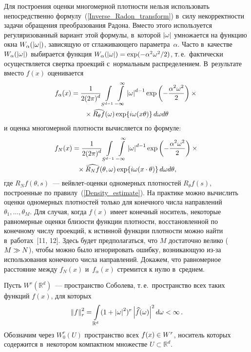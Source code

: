 \begin{multicols}{2}
Для построения оценки многомерной плот\-ности нельзя использовать непосредственно
формулу~(\ref{Inverse_Radon_transform}) в~силу некорректности задачи обращения
преобразования Радона. Вместо этого используется регуляризованный вариант
этой формулы, в~которой $\left\vert\omega\right\vert$ умножается на функцию окна
$W_\alpha(\left\vert\omega\right\vert)$, зависящую от сглаживающего параметра~$\alpha$.
Часто в~качестве $W_\alpha(\left\vert\omega\right\vert)$ выбирается функция
$W_\alpha(\abs{\omega})\hm=\exp(-\alpha^2\omega^2/2)$, т.\,е.\
фактически осуществляется свертка проекций с~нормальным распределением.
В~результате вместо $f(x)$ оценивается
\begin{multline}
\label{Regular_inverse}
f_\alpha(x)=\displaystyle\frac{\displaystyle 1\mathstrut}{\displaystyle 2(2\pi)^{d}\mathstrut}\int\limits_{S^{d-1}}
\int\limits_{-\infty}^{\infty}\left\vert\omega\right\vert^{d-1}
\exp\left(-\displaystyle\frac{\displaystyle \alpha^2\omega^2\mathstrut}{\displaystyle 2\mathstrut}\right)\times{}\\
{}\times \widehat{R_\theta f}(\omega)
\exp\{ i\omega(x\theta)\}\,d\omega d\theta
\end{multline}
и оценка многомерной плотности вычисляется по формуле:
\begin{multline}
\label{Multi_Density_estimate}
f_{N}(x)=\displaystyle\frac{\displaystyle 1\mathstrut}{\displaystyle 2(2\pi)^{d}\mathstrut}\int\limits_{S^{d-1}}
\int\limits_{-\infty}^{\infty}\left\vert\omega\right\vert^{d-1}
\exp\left(-\displaystyle\frac{\displaystyle \alpha^2\omega^2\mathstrut}{\displaystyle 2\mathstrut}\right)\times{}\\
{}\times \widehat{R_N f}(\theta,\omega)
\exp\{ i\omega(x\cdot\theta)\}\,d\omega d\theta,
\end{multline}
где $R_N f(\theta,s)$~--- вейвлет-оценки одномерных плотностей
$R_\theta f(s)$, построенные по правилу~(\ref{Density_estimate}).
На практике можно вычислить оценки одномерных плотностей только
для конечного числа направлений $\theta_1,\ldots,\theta_M$. Для случая,
когда $f(x)$ имеет конечный носитель, некоторые равномерные оценки близости
функции плотности, восстановленной по конечному числу проекций, к истинной
функции плотности можно найти в~работах~[11, 12]. Здесь будет предполагаться,
что $M$ достаточно велико ($M\hm\gg N$), чтобы можно было игнорировать ошибку,
возникающую из-за использования конечного числа направлений. Докажем,
что равномерное расстояние между $f_{N}(x)$ и~$f_\alpha(x)$ стремится к нулю
в~среднем.

Пусть $W^r(\mathbb{R}^d)$~--- пространство Соболева, т.\,е.\ пространство всех
таких функций $f(x)$, для которых
\begin{equation*}
\left\Vert f\right\Vert_r^2=\int\limits_{\mathbb{R}^d}(1+\left\vert\omega\right\vert^2)^r
\left\vert\widehat{f}(\omega)\right\vert^2d\omega<\infty\,.
\end{equation*}
Обозначим через $W^r_0(U)$ пространство всех $f(x)\hm\in W^r$, носитель которых
содержится в~некотором компактном множестве $U\subset\mathbb{R}^d$.


\end{multicols}
